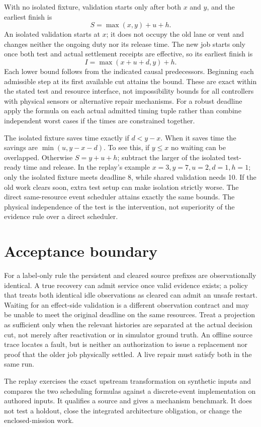 \documentclass[11pt]{article}
\begin{document}
With no isolated fixture, validation starts only after both
\(x\) and \(y\), and the earliest finish is
\[
 S=\max(x,y)+u+h .
\]
An isolated validation starts at \(x\); it does not occupy the
old lane or vent and changes neither the ongoing duty nor its
release time. The new job starts only once both test and actual
settlement receipts are effective, so its earliest finish is
\[
 I=\max(x+u+d,y)+h .
\]
Each lower bound follows from the indicated causal predecessors.
Beginning each admissible step at its first available cut
attains the bound. These are exact within the stated test
and resource interface, not impossibility bounds for all
controllers with physical sensors or alternative repair
mechanisms. For a robust deadline apply the formula on each
actual admitted timing tuple rather than combine independent
worst cases if the times are constrained together.

The isolated fixture saves time exactly if \(d<y-x\).
When it saves time the savings are \(\min(u,y-x-d)\).
To see this, if \(y\le x\) no waiting can be overlapped.
Otherwise \(S=y+u+h\); subtract the larger of the
isolated test-ready time and release. In the replay's
example \(x=3,y=7,u=2,d=1,h=1\); only the isolated
fixture meets deadline 8, while shared validation needs
10. If the old work clears soon, extra test setup can
make isolation strictly worse. The direct same-resource
event scheduler attains exactly the same bounds. The
physical independence of the test is the intervention,
not superiority of the evidence rule over a direct scheduler.

\section{Acceptance boundary}
For a label-only rule the persistent and cleared source
prefixes are observationally identical. A true recovery can
admit service once valid evidence exists; a policy that treats
both identical idle observations as cleared can admit an
unsafe restart. Waiting for an effect-side validation is a
different observation contract and may be unable to meet
the original deadline on the same resources. Treat a
projection as sufficient only when the relevant histories
are separated at the actual decision cut, not merely after
reactivation or in simulator ground truth. An offline source
trace locates a fault, but is neither an authorization to
issue a replacement nor proof that the older job physically
settled. A live repair must satisfy both in the same run.

The replay exercises the exact upstream transformation on
synthetic inputs and compares the two scheduling formulas
against a discrete-event implementation on authored inputs.
It qualifies a source and gives a mechanism benchmark.
It does not test a holdout, close the integrated architecture
obligation, or change the enclosed-mission work.
\end{document}
